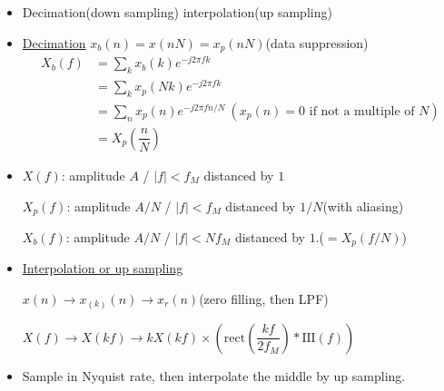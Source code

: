 \documentclass{article}
\newcommand{\shah}[1]{\mathrm{III}\left(#1\right)}
\newcommand{\rect}[1]{\mathrm{rect}\left(#1\right)}
\begin{document}
\begin{itemize}
    \item Decimation(down sampling) interpolation(up sampling)
    \item \underline{Decimation} $x_b(n)=x(nN)=x_p(nN)$(data suppression) 
    \begin{align*}
        X_b(f)&= \sum_k x_b(k)e^{-j2\pi fk}\\
        &= \sum_k x_p(Nk)e^{-j2\pi fk}\\
        &= \sum_n x_p(n)e^{-j2\pi fn/N}\:(x_p(n)=0\text{ if not a multiple of } N)\\
        &= X_p\left(\dfrac{n}{N}\right)
    \end{align*}
    \item $X(f)$: amplitude $A$ / $|f|<f_M$ distanced by $1$
    
    $X_p(f)$: amplitude $A/N$ / $|f|<f_M$ distanced by $1/N$(with aliasing)
    
    $X_b(f)$: amplitude $A/N$ / $|f|<Nf_M$ distanced by $1$.($=X_p(f/N)$)
    \item \underline{Interpolation or up sampling}
    
    $x(n)\rightarrow x_{(k)}(n) \rightarrow x_r(n)$(zero filling, then LPF)
    
    $X(f)\rightarrow X(kf) \rightarrow kX(kf)\times\left(\rect{\dfrac{kf}{2f_M}}*\shah{f}\right)$
    
    \item Sample in Nyquist rate, then interpolate the middle by up sampling.
\end{itemize}
\end{document}
